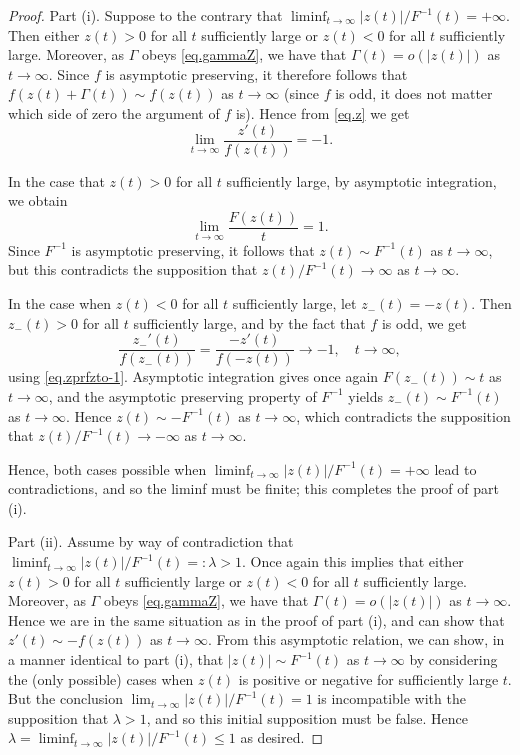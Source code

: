 \documentclass[a4paper,10pt,reqno]{amsart}
\numberwithin{equation}{section}
\theoremstyle{definition}
\theoremstyle{remark}
\DeclareMathOperator{\1}{\mathbbm 1}
\begin{document}
	\begin{proof}
		Part (i). Suppose to the contrary that $\liminf_{t\to\infty} |z(t)|/F^{-1}(t)=+\infty$. Then either $z(t)>0$ for all $t$ sufficiently large or $z(t)<0$ for all $t$ sufficiently large. Moreover, as $\Gamma$ obeys \eqref{eq.gammaZ}, we have that $\Gamma(t)=o(|z(t)|)$ as $t\to\infty$. Since $f$ is asymptotic preserving, it therefore follows that $f(z(t)+\Gamma(t))\sim f(z(t))$ as $t\to\infty$ (since $f$ is odd, it does not matter which side of zero the argument of $f$ is). Hence from \eqref{eq.z} we get
		\begin{equation} \label{eq.zprfzto-1}
			\lim_{t\to\infty} \frac{z'(t)}{f(z(t))}=-1.
		\end{equation}
		
		In the case that $z(t)>0$ for all $t$ sufficiently large, by asymptotic integration, we obtain 
		\[
		\lim_{t\to\infty} \frac{F(z(t))}{t}=1.
		\]
		Since $F^{-1}$ is asymptotic preserving, it follows that $z(t)\sim F^{-1}(t)$ as $t\to\infty$, but this contradicts the supposition that $z(t)/F^{-1}(t)\to \infty$ as $t\to\infty$.
		
		In the case when $z(t)<0$ for all $t$ sufficiently large, let $z_-(t)=-z(t)$. Then $z_-(t)>0$ for all $t$ sufficiently large, and by the fact that $f$ is odd, we get 
		\[
		\frac{z_-'(t)}{f(z_-(t))}=\frac{-z'(t)}{f(-z(t))}\to -1, \quad t\to\infty,
		\]   
		using \eqref{eq.zprfzto-1}. Asymptotic integration gives once again 
		$F(z_-(t))\sim t$ as $t\to\infty$, and the asymptotic preserving property of $F^{-1}$ yields $z_-(t)\sim F^{-1}(t)$ as $t\to\infty$. Hence $z(t)\sim -F^{-1}(t)$ as $t\to\infty$, which contradicts the supposition that 
		$z(t)/F^{-1}(t)\to -\infty$ as $t\to\infty$.
		
		Hence, both cases possible when $\liminf_{t\to\infty} |z(t)|/F^{-1}(t)=+\infty$ lead to contradictions, and so the liminf must be finite; this completes the proof of part (i).
		
		Part (ii). Assume by way of contradiction that  $\liminf_{t\to\infty} |z(t)|/F^{-1}(t)=:\lambda>1$. Once again this implies that either $z(t)>0$ for all $t$ sufficiently large or $z(t)<0$ for all $t$ sufficiently large. Moreover, as $\Gamma$ obeys \eqref{eq.gammaZ}, we have that $\Gamma(t)=o(|z(t)|)$ as $t\to\infty$.
		Hence we are in the same situation as in the proof of part (i), and can show that $z'(t)\sim -f(z(t))$ as $t\to\infty$. From this asymptotic relation, we can show, in a manner identical to part (i), that $|z(t)|\sim F^{-1}(t)$ as $t\to\infty$ by considering the (only possible) cases when $z(t)$ is positive or negative for sufficiently large $t$. But the conclusion $\lim_{t\to\infty} |z(t)|/F^{-1}(t)=1$ is incompatible with the supposition that $\lambda>1$, and so this initial supposition must be false. Hence $\lambda=\liminf_{t\to\infty} |z(t)|/F^{-1}(t)\leq 1$ as desired. 
	\end{proof}
	
\end{document}
